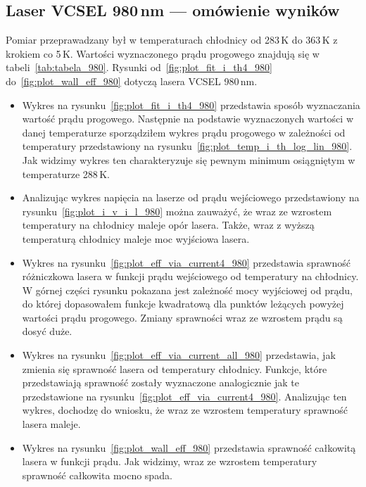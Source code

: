 \subsection{Laser VCSEL 980\,nm --- omówienie wyników}
Pomiar przeprawadzany był w temperaturach chłodnicy od 283\,K do 363\,K z krokiem co 5\,K. Wartości wyznaczonego prądu progowego
znajdują się w tabeli~\ref{tab:tabela_980}. Rysunki od~\ref{fig:plot_fit_i_th4_980} do~\ref{fig:plot_wall_eff_980} dotyczą lasera
VCSEL 980\,nm.
\begin{itemize}
\item Wykres na rysunku~\ref{fig:plot_fit_i_th4_980} przedstawia sposób wyznaczania wartość prądu progowego. Następnie na podstawie
wyznaczonych wartości w danej temperaturze sporządziłem wykres prądu progowego w zależności od temperatury
przedstawiony na rysunku~\ref{fig:plot_temp_i_th_log_lin_980}. Jak widzimy wykres ten charakteryzuje się pewnym
minimum osiągniętym w temperaturze 288\,K.
\item Analizując wykres napięcia na laserze od prądu wejściowego przedstawiony na rysunku~\ref{fig:plot_i_v_i_l_980}
można zauważyć, że wraz ze wzrostem temperatury na chłodnicy
maleje opór lasera. Także, wraz z wyższą temperaturą chłodnicy maleje moc wyjściowa lasera.
\item Wykres na rysunku~\ref{fig:plot_eff_via_current4_980} przedstawia sprawność różniczkowa lasera w funkcji prądu wejściowego
od temperatury na chłodnicy. W górnej części rysunku pokazana jest zależność mocy wyjściowej od prądu, do której dopasowałem
funkcje kwadratową dla punktów leżących powyżej wartości prądu progowego. Zmiany sprawności wraz ze wzrostem prądu są dosyć duże.
\item Wykres na rysunku~\ref{fig:plot_eff_via_current_all_980} przedstawia, jak zmienia się sprawność lasera od temperatury chłodnicy.
Funkcje, które przedstawiają sprawność zostały wyznaczone analogicznie jak te przedstawione na rysunku~\ref{fig:plot_eff_via_current4_980}.
Analizując ten wykres, dochodzę do wniosku, że wraz ze wzrostem temperatury sprawność lasera maleje.
\item Wykres na rysunku~\ref{fig:plot_wall_eff_980} przedstawia sprawność całkowitą lasera w funkcji prądu. Jak widzimy,
wraz ze wzrostem temperatury sprawność całkowita mocno spada.
\end{itemize}
